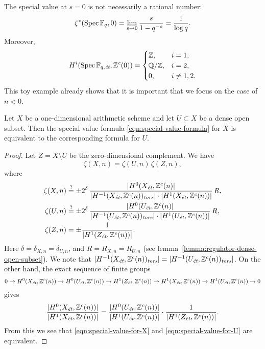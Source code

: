 \documentclass{article}
\numberwithin{equation}{section}
\begin{document}
\begin{remark}
  The special value at $s = 0$ is not necessarily a rational number:
  \[ \zeta^* (\Spec \FF_q, 0) =
    \lim_{s \to 0} \frac{s}{1 - q^{-s}} =
    \frac{1}{\log q}. \]
  Moreover,
  \[ H^i (\Spec \FF_{q,\et}, \ZZ^c (0)) =
    \begin{cases}
      \ZZ, & i = 1, \\
      \QQ/\ZZ, & i = 2, \\
      0, & i \ne 1,2.
    \end{cases} \]
  This toy example already shows that it is important that we focus on the case
  of $n < 0$.
\end{remark}

\begin{lemma}
  \label{lemma:elementary-proof-2}
  Let $X$ be a one-dimensional arithmetic scheme and let $U \subset X$ be a
  dense open subset. Then the special value formula
  \eqref{eqn:special-value-formula} for $X$ is equivalent to the corresponding
  formula for $U$.

  \begin{proof}
    Let $Z = X\setminus U$ be the zero-dimensional complement. We have
    $$\zeta (X,n) = \zeta (U,n)\,\zeta (Z,n),$$
    where
    \begin{align}
      \label{eqn:special-value-for-X} \zeta (X,n) & \stackrel{?}{=} \pm 2^\delta\,\frac{|H^0 (X_\et, \ZZ^c (n)|}{|H^{-1} (X_\et, \ZZ^c (n))_\tors| \cdot |H^1 (X_\et, \ZZ^c (n))|}\,R, \\
      \label{eqn:special-value-for-U} \zeta (U,n) & \stackrel{?}{=} \pm 2^\delta\,\frac{|H^0 (U_\et, \ZZ^c (n)|}{|H^{-1} (U_\et, \ZZ^c (n))_\tors| \cdot |H^1 (U_\et, \ZZ^c (n))|}\,R, \\
      \notag \zeta (Z,n) & = \pm\frac{1}{|H^1 (Z_\et, \ZZ^c (n))|}.
    \end{align}
    Here $\delta = \delta_{X,n} = \delta_{U,n}$, and $R = R_{X,n} = R_{U,n}$
    (see lemma~\ref{lemma:regulator-dense-open-subset}). We note that
    $|H^{-1} (X_\et, \ZZ^c (n))_\tors| = |H^{-1} (U_\et, \ZZ^c (n))_\tors|$.
    On the other hand, the exact sequence of finite groups
    \[ 0 \to H^0 (X_\et, \ZZ^c (n)) \to
      H^0 (U_\et, \ZZ^c (n)) \to
      H^1 (Z_\et, \ZZ^c (n)) \to
      H^1 (X_\et, \ZZ^c (n)) \to
      H^1 (U_\et, \ZZ^c (n)) \to 0 \]
    gives
    \[ \frac{|H^0 (X_\et, \ZZ^c (n))|}{|H^1 (X_\et, \ZZ^c (n))|} =
      \frac{|H^0 (U_\et, \ZZ^c (n))|}{|H^1 (U_\et, \ZZ^c (n))|}\cdot
      \frac{1}{|H^1 (Z_\et, \ZZ^c (n))|}. \]
    From this we see that \eqref{eqn:special-value-for-X} and
    \eqref{eqn:special-value-for-U} are equivalent.
  \end{proof}
\end{lemma}
\end{document}
